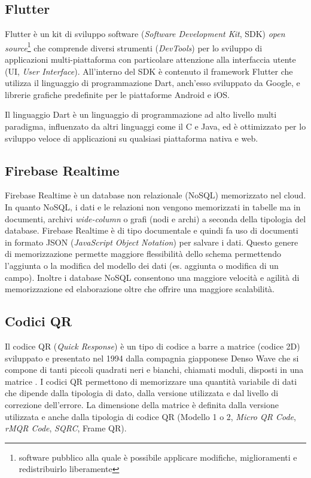 \subsection{Flutter}
Flutter \cite{flutter} è un kit di sviluppo software (\textit{Software Development Kit}, SDK) \textit{open source}\footnote{software pubblico alla quale è possibile applicare modifiche, miglioramenti e redistribuirlo liberamente} che comprende diversi strumenti (\textit{DevTools}) per lo sviluppo di applicazioni multi-piattaforma con particolare attenzione alla interfaccia utente (UI, \textit{User Interface}). All'interno del SDK è contenuto il framework Flutter che utilizza il linguaggio di programmazione Dart, anch'esso sviluppato da Google, e librerie grafiche predefinite per le piattaforme Android e iOS.

Il linguaggio Dart è un linguaggio di programmazione ad alto livello multi paradigma, influenzato da altri linguaggi come il C e Java, ed è ottimizzato per lo sviluppo veloce di applicazioni su qualsiasi piattaforma nativa e web.

\subsection{Firebase Realtime}
Firebase Realtime \cite{firebase} è un database non relazionale (NoSQL) memorizzato nel cloud. In quanto NoSQL, i dati e le relazioni non vengono memorizzati in tabelle ma in documenti, archivi \textit{wide-column} o grafi (nodi e archi) a seconda della tipologia del database.
Firebase Realtime è di tipo documentale e quindi fa uso di documenti in formato JSON (\textit{JavaScript Object Notation}) per salvare i dati. Questo genere di memorizzazione permette maggiore flessibilità dello schema permettendo l'aggiunta o la modifica del modello dei dati (es. aggiunta o modifica di un campo). Inoltre i database NoSQL consentono una maggiore velocità e agilità di memorizzazione ed elaborazione oltre che offrire una maggiore scalabilità.
%
\subsection{Codici QR}
Il codice QR (\textit{Quick Response}) è un tipo di codice a barre a matrice (codice 2D) sviluppato e presentato nel 1994 dalla compagnia giapponese Denso Wave che si compone di tanti piccoli quadrati neri e bianchi, chiamati moduli, disposti in una matrice \cite{qrCodeDensoWave}.
I codici QR permettono di memorizzare una quantità variabile di dati che dipende dalla tipologia di dato, dalla versione utilizzata e dal livello di correzione dell'errore. La dimensione della matrice è definita dalla versione utilizzata e anche dalla tipologia di codice QR (Modello 1 o 2, \textit{Micro QR Code}, \textit{rMQR Code}, \textit{SQRC}, Frame QR).

